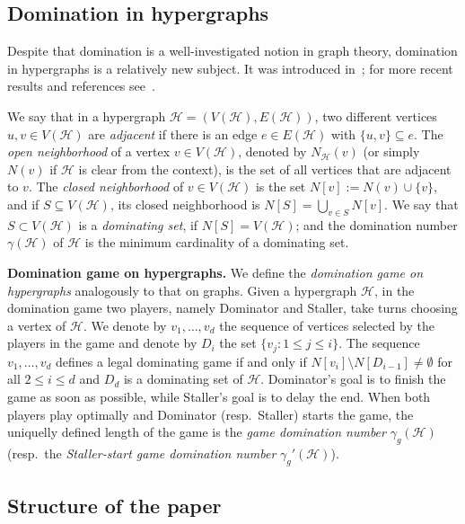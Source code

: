 \documentclass[12pt]{article}
\newcommand\cH{{\mathcal H}}
\begin{document}
\subsection*{Domination in hypergraphs}

Despite that domination is a well-investigated notion in graph theory, domination in hypergraphs is a relatively new subject. It was introduced in~\cite{A2007}; for more recent results and references see~\cite{BHT, BPTV2017, HL-2012, HL-2016,KLDS}. 

\vspace{2mm}

We say that in a hypergraph $\cH=(V(\cH), E(\cH))$, two different vertices $u,v \in V(\cH)$ are \emph{adjacent} if there is an edge $e \in E(\cH)$ with $\{u,v\}\subseteq e$. The \emph{open neighborhood} of a vertex $v \in V(\cH)$, denoted by $N_{\cH}(v)$ (or
simply $N(v)$ if $\cH$ is clear from the context), is the set of all
vertices that are adjacent to $v$. The \emph{closed neighborhood} of $v \in V(\cH)$ is the set $N[v]:=N(v)\cup \{v\}$, and if $S \subseteq V(\cH)$, its closed neighborhood is $N[S]= \bigcup_{v \in S} N[v]$. We say that $S \subset V(\cH)$ is a \textit{dominating set}, if $N[S] = V(\cH)$; and the domination number $\gamma(\cH)$ of $\cH$ is the minimum cardinality of a dominating set.

\vspace{2mm}

\noindent
\textbf{Domination game on hypergraphs.}
We define the \textit{domination game on hypergraphs} analogously to that on graphs. Given a hypergraph $\cH$, in the domination game  two players, namely Dominator and Staller, take turns choosing a vertex of $\cH$. We denote by $v_1,\dots, v_d$ the sequence of vertices selected by the players in the game and denote by $D_i$ the set $\{v_j: 1 \le j \le i\}$.  The sequence $v_1,\dots, v_d$ defines a legal dominating game if and only if  $N[v_{i}]\setminus N[D_{i-1}]\neq \emptyset$ for all $2\le i\le d$ and $D_d$ is a dominating set of $\cH$. Dominator's goal is to finish the game as soon as possible, while Staller's goal is to delay the end. When both players play optimally and Dominator (resp.\ Staller) starts the game, the uniquelly defined length of the game is the \textit{game domination number} $\gamma_g(\cH)$ (resp.\ the \textit{Staller-start game domination number} $\gamma_g'(\cH)$).



\subsection*{Structure of the paper}
\end{document}
